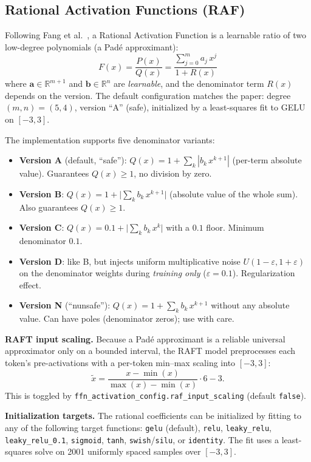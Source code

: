 \subsection{Rational Activation Functions (RAF)}
\label{sec:raf}

Following Fang et al.~\citep{fang2023raft}, a Rational Activation Function is a
learnable ratio of two low-degree polynomials (a Pad\'e approximant):
\[
  F(x) = \frac{P(x)}{Q(x)}
        = \frac{\displaystyle\sum_{j=0}^{m} a_j\, x^{j}}
               {1 + R(x)}
\]
where $\mathbf{a}\in\mathbb{R}^{m+1}$ and $\mathbf{b}\in\mathbb{R}^{n}$ are
\emph{learnable}, and the denominator term $R(x)$ depends on the version.
The default configuration matches the paper: degree $(m,n)=(5,4)$, version
``A'' (safe), initialized by a least-squares fit to GELU on $[-3,3]$.

The implementation supports five denominator variants:

\begin{itemize}[leftmargin=*]
  \item \textbf{Version A} (default, ``safe''):
    $Q(x)=1+\sum_{k}|b_k\, x^{k+1}|$ (per-term absolute value).
    Guarantees $Q(x)\ge 1$, no division by zero.
  \item \textbf{Version B}: $Q(x)=1+\big|\sum_{k} b_k\, x^{k+1}\big|$
    (absolute value of the whole sum). Also guarantees $Q(x)\ge 1$.
  \item \textbf{Version C}: $Q(x)=0.1+\big|\sum_{k} b_k\, x^{k}\big|$
    with a $0.1$ floor. Minimum denominator $0.1$.
  \item \textbf{Version D}: like B, but injects uniform multiplicative noise
    $U(1-\varepsilon, 1+\varepsilon)$ on the denominator weights during
    \emph{training only} ($\varepsilon=0.1$). Regularization effect.
  \item \textbf{Version N} (``nunsafe''):
    $Q(x)=1+\sum_{k} b_k\, x^{k+1}$ without any absolute value.
    Can have poles (denominator zeros); use with care.
\end{itemize}

\textbf{RAFT input scaling.} Because a Pad\'e approximant is a reliable
universal approximator only on a bounded interval, the RAFT model preprocesses
each token's pre-activations with a per-token min--max scaling into $[-3,3]$:
\[
  \tilde{x} = \frac{x-\min(x)}{\max(x)-\min(x)}\cdot 6 - 3.
\]
This is toggled by \texttt{ffn\_activation\_config.raf\_input\_scaling}
(default \texttt{false}).

\textbf{Initialization targets.} The rational coefficients can be initialized by
fitting to any of the following target functions: \texttt{gelu} (default),
\texttt{relu}, \texttt{leaky\_relu}, \texttt{leaky\_relu\_0.1},
\texttt{sigmoid}, \texttt{tanh}, \texttt{swish}/\texttt{silu}, or
\texttt{identity}. The fit uses a least-squares solve on 2001 uniformly spaced
samples over $[-3,3]$.

